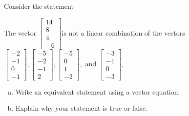 
\begin{exerciseStatement}


Consider the statement 
\begin{center}\begin{minipage}{0.8\textwidth}
 The vector \( \left[\begin{array}{c}
14 \\
8 \\
4 \\
-6
\end{array}\right] \)is not a linear combination of the vectors \( \left[\begin{array}{c}
-2 \\
-1 \\
0 \\
-1
\end{array}\right] , \left[\begin{array}{c}
-5 \\
-2 \\
-1 \\
2
\end{array}\right] , \left[\begin{array}{c}
-5 \\
0 \\
1 \\
-2
\end{array}\right] , \text{ and } \left[\begin{array}{c}
-3 \\
-1 \\
0 \\
-3
\end{array}\right] \). 
\end{minipage}\end{center}
    


\begin{enumerate}[(a)]
\item  Write an equivalent statement using a vector equation.
\item  Explain why your statement is true or false.
\end{enumerate}
    
\end{exerciseStatement}
    
